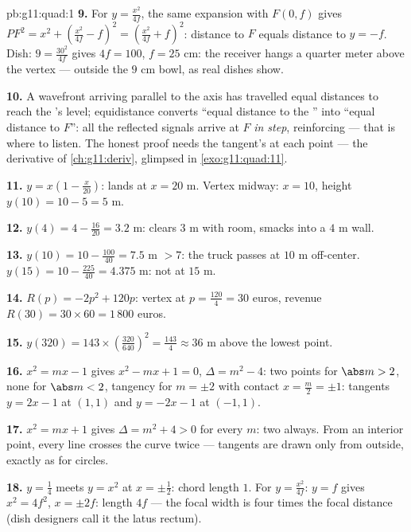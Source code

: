 \begin{solution}{pb:g11:quad:1}
\textbf{9.} For $y = \frac{x^2}{4f}$, the same expansion with
$F(0, f)$ gives $PF^2 = x^2 + \left(\frac{x^2}{4f} - f\right)^2
= \left(\frac{x^2}{4f} + f\right)^2$: distance to $F$ equals
distance to $y = -f$. Dish: $9 = \frac{30^2}{4f}$ gives
$4f = 100$, $f = 25$ cm: the receiver hangs a quarter meter
above the vertex --- outside the $9$ cm bowl, as real dishes
show.

\textbf{10.} A wavefront arriving parallel to the axis has
travelled equal distances to reach the 's level;
equidistance converts ``equal distance to the '' into
``equal distance to $F$'': all the reflected signals arrive at
$F$ \emph{in step}, reinforcing --- that is where to listen.
The honest proof needs the tangent's  at each point ---
the derivative of \cref{ch:g11:deriv}, glimpsed in
\cref{exo:g11:quad:11}.

\textbf{11.} $y = x\left(1 - \frac{x}{20}\right)$: lands at
$x = 20$ m. Vertex midway: $x = 10$, height
$y(10) = 10 - 5 = 5$ m.

\textbf{12.} $y(4) = 4 - \frac{16}{20} = 3.2$ m: clears $3$ m
with room, smacks into a $4$ m wall.

\textbf{13.} $y(10) = 10 - \frac{100}{40} = 7.5$ m $> 7$: the
truck passes at $10$ m off-center. $y(15) = 10 - \frac{225}{40}
= 4.375$ m: not at $15$ m.

\textbf{14.} $R(p) = -2p^2 + 120p$: vertex at
$p = \frac{120}{4} = 30$ euros, revenue
$R(30) = 30 \times 60 = 1\,800$ euros.

\textbf{15.} $y(320) = 143 \times \left(\frac{320}{640}\right)^2
= \frac{143}{4} \approx 36$ m above the lowest point.

\textbf{16.} $x^2 = mx - 1$ gives $x^2 - mx + 1 = 0$,
$\Delta = m^2 - 4$: two points for $\abs m > 2$, none for
$\abs m < 2$, tangency for $m = \pm 2$ with contact
$x = \frac m2 = \pm 1$: tangents $y = 2x - 1$ at $(1, 1)$ and
$y = -2x - 1$ at $(-1, 1)$.

\textbf{17.} $x^2 = mx + 1$ gives $\Delta = m^2 + 4 > 0$ for
every $m$: two  always. From an interior point,
every line crosses the curve twice --- tangents are drawn only
from outside, exactly as for circles.

\textbf{18.} $y = \frac14$ meets $y = x^2$ at $x = \pm\frac12$:
chord length $1$. For $y = \frac{x^2}{4f}$: $y = f$ gives
$x^2 = 4f^2$, $x = \pm 2f$: length $4f$ --- the focal width is
four times the focal distance (dish designers call it the
latus rectum).


\end{solution}
